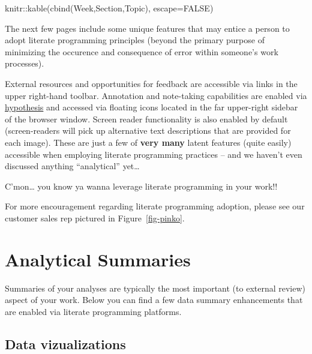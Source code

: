 \documentclass[
  letterpaper,
  DIV=11,
  numbers=noendperiod,
  oneside]{scrreprt}
\newenvironment{Shaded}{\begin{snugshade}}{\end{snugshade}}
\newcommand{\AttributeTok}[1]{\textcolor[rgb]{0.40,0.45,0.13}{#1}}
\newcommand{\ConstantTok}[1]{\textcolor[rgb]{0.56,0.35,0.01}{#1}}
\newcommand{\FunctionTok}[1]{\textcolor[rgb]{0.28,0.35,0.67}{#1}}
\newcommand{\NormalTok}[1]{\textcolor[rgb]{0.00,0.23,0.31}{#1}}
\newcommand{\SpecialCharTok}[1]{\textcolor[rgb]{0.37,0.37,0.37}{#1}}
\begin{document}
\begin{Shaded}
\begin{Highlighting}[]
\NormalTok{knitr}\SpecialCharTok{::}\FunctionTok{kable}\NormalTok{(}\FunctionTok{cbind}\NormalTok{(Week,Section,Topic), }\AttributeTok{escape=}\ConstantTok{FALSE}\NormalTok{)}
\end{Highlighting}
\end{Shaded}

The next few pages include some unique features that may entice a person
to adopt literate programming principles (beyond the primary purpose of
minimizing the occurence and consequence of error within someone's work
processes).

External resources and opportunities for feedback are accessible via
links in the upper right-hand toolbar. Annotation and note-taking
capabilities are enabled via \href{https://web.hypothes.is/}{hypothesis}
and accessed via floating icons located in the far upper-right sidebar
of the browser window. Screen reader functionality is also enabled by
default (screen-readers will pick up alternative text descriptions that
are provided for each image). These are just a few of \textbf{very many}
latent features (quite easily) accessible when employing literate
programming practices -- and we haven't even discussed anything
``analytical'' yet\ldots{}

\begin{marginfigure}


\caption{\label{fig-pinko}C'mon\ldots{} you know ya wanna leverage
literate programming in your work!!}

\end{marginfigure}%

For more encouragement regarding literate programming adoption, please
see our customer sales rep pictured in Figure~\ref{fig-pinko}.


\chapter{Analytical Summaries}\label{sec-summary}

Summaries of your analyses are typically the most important (to external
review) aspect of your work. Below you can find a few data summary
enhancements that are enabled via literate programming platforms.

\section{Data vizualizations}\label{data-vizualizations}
\end{document}
